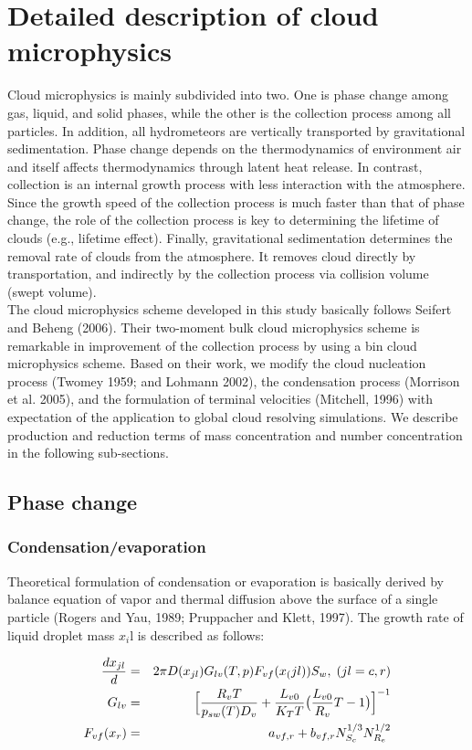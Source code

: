 \section{Detailed description of cloud microphysics}
Cloud microphysics is mainly subdivided into two. One is phase change among gas, liquid, and solid phases, while the other is the collection process among all particles. In addition, all hydrometeors are vertically transported by gravitational sedimentation. Phase change depends on the thermodynamics of environment air and itself affects thermodynamics through latent heat release. In contrast, collection is an internal growth process with less interaction with the atmosphere. Since the growth speed of the collection process is much faster than that of phase change, the role of the collection process is key to determining the lifetime of clouds (e.g., lifetime effect). Finally, gravitational sedimentation determines the removal rate of clouds from the atmosphere. It removes cloud directly by transportation, and indirectly by the collection process via collision volume (swept volume).\\
The cloud microphysics scheme developed in this study basically follows Seifert and Beheng (2006). Their two-moment bulk cloud microphysics scheme is remarkable in improvement of the collection process by using a bin cloud microphysics scheme. Based on their work, we modify the cloud nucleation process (Twomey 1959; and Lohmann 2002), the condensation process (Morrison et al. 2005), and the formulation of terminal velocities (Mitchell, 1996) with expectation of the application to global cloud resolving simulations. We describe production and reduction terms of mass concentration and number concentration in the following sub-sections.

\subsection{Phase change}
\subsubsection{Condensation/evaporation}
Theoretical formulation of condensation or evaporation is basically derived by balance equation of vapor and thermal diffusion above the surface of a single particle (Rogers and Yau, 1989; Pruppacher and Klett, 1997). The growth rate of liquid droplet mass $x_{i}$l is described as follows:

\begin{eqnarray}
\frac{dx_{jl}}{d}&=&2\pi D(x_{jl})G_{lv}(T,p)F_{vf}(x_(jl))S_{w},\; (jl=c,r)\label{sn66}\\
G_{lv}&=&\Bigl[\frac{R_{v}T}{p_{sw}(T)D_{v}}+\frac{L_{v0}}{K_{T}T}\bigl(\frac{L_{v0}}{R_{v}}{T}-1\bigr)\Bigr]^{-1}\label{sn67}\\
F_{vf}(x_{r})&=&a_{vf,r}+b_{vf,r}N_{S_{c}}^{1/3}N_{R_{e}}^{1/2}\label{sn68}
\end{eqnarray}

